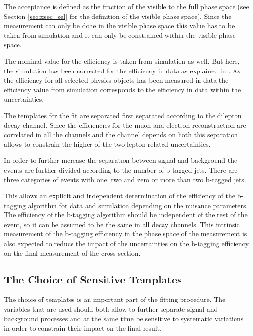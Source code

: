 The acceptance is defined as the fraction of the visible to the full phase space (see Section \ref{sec:xsec_sel} for the definition of the visible phase space).
Since the measurement can only be done in the visible phase space this value has to be taken from simulation and it can only be constrained within the visible phase space.

The nominal value for the efficiency is taken from simulation as well.  But here, the simulation has been corrected for the efficiency in data as explained in . 
As the efficiency for all selected physics objects has been measured in data the efficiency value from simulation corresponds to the efficiency in data within the uncertainties.

The templates for the fit are separated first separated according to the dilepton decay channel. Since the efficiencies for the muon and electron reconstruction are correlated in all the channels and the \emu channel depends on both this separation allows to constrain the higher of the two lepton related uncertainties.

In order to further increase the separation between signal and background the events are further divided according to the number of b-tagged jets.
There are three categories of events with one, two and zero or more than two b-tagged jets.

This allows an explicit and independent determination of the efficiency of the b-tagging algorithm for data and simulation depending on the nuisance parameters. The efficiency of the b-tagging algorithm should be independent of the rest of the event, so it can be assumed to be the same in all \ttbar decay channels.
This intrinsic measurement of the b-tagging efficiency in the phase space of the measurement is also expected to reduce the impact of the uncertainties on the b-tagging efficiency on the final measurement of the \ttbar cross section.


\subsection{The Choice of Sensitive Templates}
\label{sec:xsec_templates}

The choice of templates is an important part of the fitting procedure.
The variables that are used should both allow to further separate signal and background processes and at the same time be sensitive to systematic
variations in order to constrain their impact on the final result.

